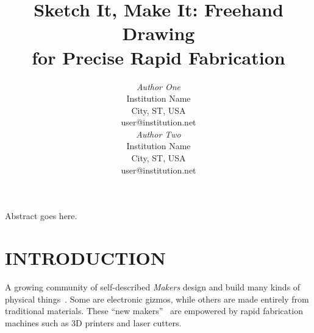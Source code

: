 \documentclass{article}
\begin{document}

\toappear{}



\title{Sketch It, Make It: Freehand Drawing\\
for Precise Rapid Fabrication}

\author{
\parbox[t]{9cm}{\centering
	     {\em Author One}\\
	     Institution Name\\
             City, ST, USA\\
	     user@institution.net}
\parbox[t]{9cm}{\centering
	     {\em Author Two}\\
	     Institution Name\\
             City, ST, USA\\
	     user@institution.net}
}

\maketitle

\abstract Abstract goes here. 






\section{INTRODUCTION}

A growing community of self-described \textit{Makers} design and build
many kinds of physical things~\cite{gershenfeld-fab}. Some are
electronic gizmos, while others are made entirely from traditional
materials. These ``new makers''~\cite{gross-new-makers} are empowered
by rapid fabrication machines such as 3D printers and laser cutters.
\end{document}
